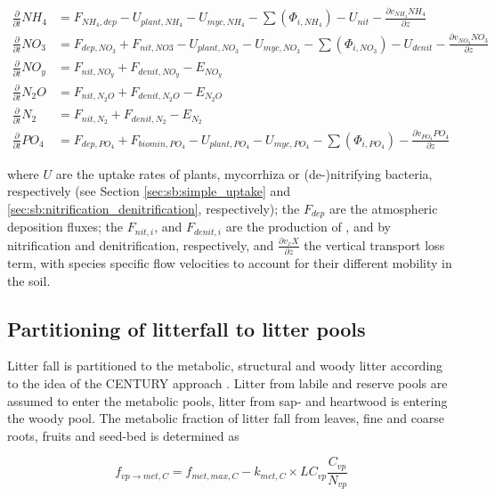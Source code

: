 \begin{subequations}\label{eq:sb:simple_im_dynamics}
\begin{align}
\frac{\partial}{\partial t} NH_4 &= F_{NH_4,dep} - U_{plant,NH_4} - U_{myc,NH_4} - \sum(\Phi_{i,NH_4}) - U_{nit} - \frac{\partial v_{NH_4} NH_4}{\partial z}\\
\frac{\partial}{\partial t} NO_3 &= F_{dep,NO_3} + F_{nit,NO3} - U_{plant,NO_3} - U_{myc,NO_3} - \sum(\Phi_{i,NO_3}) - U_{denit} - \frac{\partial v_{NO_3} NO_3}{\partial z}\\
\frac{\partial}{\partial t} NO_y &= F_{nit,NO_y} + F_{denit,NO_y} - E_{NO_y} \\
\frac{\partial}{\partial t} N_2O &= F_{nit,N_2O} + F_{denit,N_2O} - E_{N_2O} \\
\frac{\partial}{\partial t} N_2 &=  F_{nit,N_2} + F_{denit,N_2} - E_{N_2}\\
\frac{\partial}{\partial t} PO_4 &= F_{dep,PO_4} + F_{biomin,PO_4} - U_{plant,PO_4} - U_{myc,PO_4} - \sum(\Phi_{i,PO_4}) -  \frac{\partial v_{PO_4} PO_4}{\partial z} 
\end{align}
\end{subequations}

where $U$ are the uptake rates of plants, mycorrhiza or (de-)nitrifying bacteria, respectively (see Section \ref{sec:sb:simple_uptake} and \ref{sec:sb:nitrification_denitrification}, respectively); the $F_{dep}$ are the atmospheric deposition fluxes; the $F_{nit,i}$, and $F_{denit,i}$ are the production of ,  and  by nitrification and denitrification, respectively, and $\frac{\partial v_{x} X}{\partial z}$ the vertical transport loss term, with species specific flow velocities to account for their different mobility in the soil.

\subsection{Partitioning of litterfall to litter pools}\label{sec:sb:litter_partitioning}

Litter fall is partitioned to the metabolic, structural and woody litter according to the idea of the CENTURY approach \cite{Parton:1993ud}. Litter from labile and reserve pools are assumed to enter the metabolic pools, litter from sap- and heartwood is entering the woody pool. The metabolic fraction of litter fall from leaves, fine and coarse roots, fruits and seed-bed is determined as 

\begin{equation}\label{eq:sb:simple_litterpartitioning_c}
f_{vp \rightarrow met,C} = f_{met,max,C} - k_{met,C} \times LC_{vp} \frac{C_{vp}}{N_{vp}}
\end{equation}

